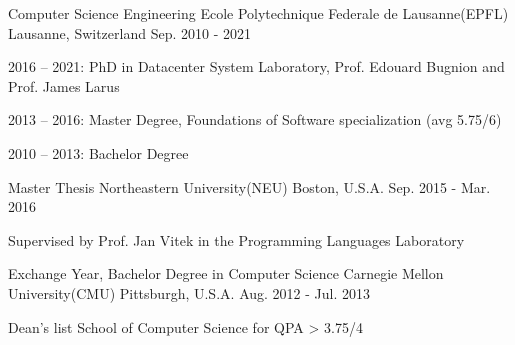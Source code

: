 


\begin{cventries}


\cventry
{Computer Science Engineering} %
{Ecole Polytechnique Federale de Lausanne(EPFL)} %
{Lausanne, Switzerland} %
{Sep. 2010 - 2021} %
{ %
\begin{cvitems}
\item {2016 -- 2021: PhD in Datacenter System Laboratory, Prof. Edouard Bugnion and Prof. James Larus}
\item {2013 -- 2016: Master Degree, Foundations of Software specialization (avg 5.75/6)}
\item {2010 -- 2013: Bachelor Degree}
\end{cvitems}
}

\cventry
{Master Thesis}
{Northeastern University(NEU)}
{Boston, U.S.A.}
{Sep. 2015 - Mar. 2016}
{
	\begin{cvitems}
	\item{Supervised by Prof. Jan Vitek in the Programming Languages Laboratory}
	\end{cvitems}
}

\cventry
{Exchange Year, Bachelor Degree in Computer Science}
{Carnegie Mellon University(CMU)}
{Pittsburgh, U.S.A.}
{Aug. 2012 - Jul. 2013}
{
	\begin{cvitems}
	\item{Dean's list School of Computer Science for QPA > 3.75/4}
	\end{cvitems}
}



\end{cventries}
